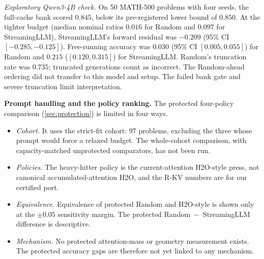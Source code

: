 \documentclass{article}
\begin{document}
\emph{Exploratory Qwen3-4B check.} On 50 MATH-500 problems with four seeds, the full-cache bank scored $0.845$, below its pre-registered lower bound of $0.850$. At the tighter budget (median nominal ratios $0.016$ for Random and $0.097$ for StreamingLLM), StreamingLLM's forward residual was $-0.209$ (95\% CI $[-0.285,-0.125]$). Free-running accuracy was $0.030$ (95\% CI $[0.005,0.055]$) for Random and $0.215$ ($[0.120,0.315]$) for StreamingLLM. Random's truncation rate was $0.735$; truncated generations count as incorrect. The Random-ahead ordering did not transfer to this model and setup. The failed bank gate and severe truncation limit interpretation.

\textbf{Prompt handling and the policy ranking.} The protected four-policy comparison (\cref{sec:protection}) is limited in four ways.
\begin{itemize}
\item \emph{Cohort.} It uses the strict-fit cohort: $97$ problems, excluding the three whose prompt would force a relaxed budget. The whole-cohort comparison, with capacity-matched unprotected comparators, has not been run.
\item \emph{Policies.} The heavy-hitter policy is the current-attention H2O-style press, not canonical accumulated-attention H2O, and the R-KV numbers are for our certified port.
\item \emph{Equivalence.} Equivalence of protected Random and H2O-style is shown only at the $\pm 0.05$ sensitivity margin. The protected Random~$-$~StreamingLLM difference is descriptive.
\item \emph{Mechanism.} No protected attention-mass or geometry measurement exists. The protected accuracy gaps are therefore not yet linked to any mechanism.
\end{itemize}
\end{document}
